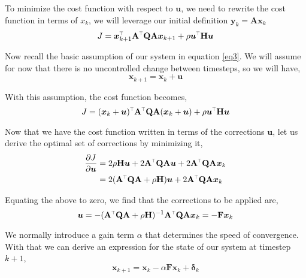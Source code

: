 \documentclass[SE,authoryear,toc]{lsstdoc}
\renewcommand{\v}[1]{\mathbf{#1}}
\newcommand{\tr}{\scalebox{0.6}{$\top$}}
\begin{document}
To minimize the cost function with respect to $\bm{u}$, we need to rewrite the cost function in terms of $x_k$, we will leverage our initial definition $\bm{y}_k = \v{A} \bm{x}_k$
\begin{equation}
     J = \bm{x}_{k+1}^{\tr}\v{A}^{\tr}\v{Q}\v{A}\bm{x}_{k+1} + \rho \bm{u}^{\tr}\v{H}\bm{u}
\end{equation}

Now recall the basic assumption of our system in equation \ref{eq3}. We will assume for now that there is no uncontrolled change between timesteps, so we will have, 
\begin{equation}
    \bm{x}_{k+1} = \bm{x}_k + \bm{u}
\end{equation}

With this assumption, the cost function becomes, 
\begin{equation}
     J = (\bm{x}_{k} + \bm{u})^{\tr}\v{A}^{\tr}\v{Q}\v{A}(\bm{x}_{k} + \bm{u}) + \rho \bm{u}^{\tr}\v{H}\bm{u}
\end{equation}

Now that we have the cost function written in terms of the corrections $\bm{u}$, let us derive the optimal set of corrections by minimizing it, 
\begin{equation}
\begin{split}
    \frac{\partial J}{\partial \bm{u}} & = 2\rho \v{H} \bm{u} + 2 \v{A}^{\tr}\v{Q}\v{A} \bm{u} + 2\v{A}^{\tr}\v{Q}\v{A} \bm{x}_k \\
    & = 2( \v{A}^{\tr}\v{Q}\v{A} + \rho \v{H})\bm{u} + 2 \v{A}^{\tr}\v{Q}\v{A} \bm{x}_k
\end{split}
\end{equation}

Equating the above to zero, we find that the corrections to be applied are, 
\begin{equation}
    \bm{u} = -(\v{A}^{\tr}\v{Q}\v{A} + \rho \v{H})^{-1}\v{A}^{\tr}\v{Q}\v{A}\bm{x}_k = -\v{F}\bm{x}_k
\end{equation}

We normally introduce a gain term $\alpha$ that determines the speed of convergence. With that we can derive an expression for the state of our system at timestep $k+1$,
\begin{equation}\label{eq4}
    \bm{x}_{k + 1} = \bm{x}_{k} - \alpha\v{F}\bm{x}_k + \bm{\delta}_{k}
\end{equation}
\end{document}
